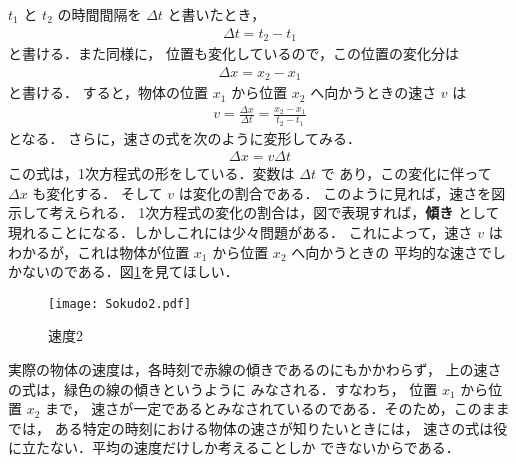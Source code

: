                 $t_{1}$ と $t_{2}$ の時間間隔を $\Delta t$ と書いたとき，
                \begin{align}
                    \Delta t=t_{2}-t_{1}
                \end{align}
                と書ける．また同様に，
                位置も変化しているので，この位置の変化分は
                \begin{align}
                    \Delta x=x_{2}-x_{1}
                \end{align}
                と書ける．
                すると，物体の位置 $x_{1}$ から位置 $x_{2}$ へ向かうときの速さ $v$ は
                \begin{align}
                    v=\frac{\Delta x}{\Delta t}=\frac{x_{2}-x_{1}}{t_{2}-t_{1}}
                \end{align}
                となる．
                さらに，速さの式を次のように変形してみる．
                \begin{align}
                    \Delta x=v\Delta t
                \end{align}
                この式は，1次方程式の形をしている．変数は $\Delta t$ で
                あり，この変化に伴って $\Delta x$ も変化する．
                そして $v$ は変化の割合である．
                このように見れば，速さを図示して考えられる．
                1次方程式の変化の割合は，図で表現すれば，\textbf{傾き} として
                現れることになる．しかしこれには少々問題がある．
                これによって，速さ $v$ は
                わかるが，これは物体が位置 $x_{1}$ から位置 $x_{2}$ へ向かうときの
                平均的な速さでしかないのである．図\ref{fig:Sokudo2}を見てほしい．
                \begin{figure}[hbt]
                    \begin{center}
                        \texttt{[image: Sokudo2.pdf]}
                        \caption{速度2}
                        \label{fig:Sokudo2}
                    \end{center}
                \end{figure}

                実際の物体の速度は，各時刻で赤線の傾きであるのにもかかわらず，
                上の速さの式は，緑色の線の傾きというように
                みなされる．すなわち，
                位置 $x_{1}$ から位置 $x_{2}$ まで，
                速さが一定であるとみなされているのである．そのため，このままでは，
                ある特定の時刻における物体の速さが知りたいときには，
                速さの式は役に立たない．平均の速度だけしか考えることしか
                できないからである．

